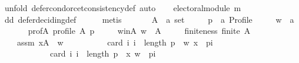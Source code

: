 \begin{isabellebody}
%
\isadelimproof
%
\endisadelimproof
%
\isatagproof
{}\isamarkupfalse%
\ {\isacharparenleft}{\kern0pt}unfold\ defer{\isacharunderscore}{\kern0pt}condorcet{\isacharunderscore}{\kern0pt}consistency{\isacharunderscore}{\kern0pt}def{\isacharcomma}{\kern0pt}\ auto{\isacharparenright}{\kern0pt}\isanewline
\ \ \isamarkupfalse%
\ {\isachardoublequoteopen}electoral{\isacharunderscore}{\kern0pt}module\ m{\isachardoublequoteclose}\isanewline
\ \ \ \ \isamarkupfalse%
\ dd\ defer{\isacharunderscore}{\kern0pt}deciding{\isacharunderscore}{\kern0pt}def\isanewline
\ \ \ \ \isamarkupfalse%
\ metis\isanewline
{}\isamarkupfalse%
\isanewline
\ \ \isamarkupfalse%
\isanewline
\ \ \ \ A\ {\isacharcolon}{\kern0pt}{\isacharcolon}{\kern0pt}\ {\isachardoublequoteopen}{\isacharprime}{\kern0pt}a\ set{\isachardoublequoteclose}\ \isanewline
\ \ \ \ p\ {\isacharcolon}{\kern0pt}{\isacharcolon}{\kern0pt}\ {\isachardoublequoteopen}{\isacharprime}{\kern0pt}a\ Profile{\isachardoublequoteclose}\ \isanewline
\ \ \ \ w\ {\isacharcolon}{\kern0pt}{\isacharcolon}{\kern0pt}\ {\isachardoublequoteopen}{\isacharprime}{\kern0pt}a{\isachardoublequoteclose}\isanewline
\ \ \isamarkupfalse%
\isanewline
\ \ \ \ prof{\isacharunderscore}{\kern0pt}A{\isacharcolon}{\kern0pt}\ {\isachardoublequoteopen}profile\ A\ p{\isachardoublequoteclose}\ \isanewline
\ \ \ \ w{\isacharunderscore}{\kern0pt}in{\isacharunderscore}{\kern0pt}A{\isacharcolon}{\kern0pt}\ {\isachardoublequoteopen}w\ {\isasymin}\ A{\isachardoublequoteclose}\ \isanewline
\ \ \ \ finiteness{\isacharcolon}{\kern0pt}\ {\isachardoublequoteopen}finite\ A{\isachardoublequoteclose}\ \isanewline
\ \ \ \ assm{\isacharcolon}{\kern0pt}\ {\isachardoublequoteopen}{\isasymforall}x{\isasymin}A\ {\isacharminus}{\kern0pt}\ {\isacharbraceleft}{\kern0pt}w{\isacharbraceright}{\kern0pt}{\isachardot}{\kern0pt}\isanewline
\ \ \ \ \ \ \ \ \ \ card\ {\isacharbraceleft}{\kern0pt}i{\isachardot}{\kern0pt}\ i\ {\isacharless}{\kern0pt}\ length\ p\ {\isasymand}\ {\isacharparenleft}{\kern0pt}w{\isacharcomma}{\kern0pt}\ x{\isacharparenright}{\kern0pt}\ {\isasymin}\ {\isacharparenleft}{\kern0pt}p{\isacharbang}{\kern0pt}i{\isacharparenright}{\kern0pt}{\isacharbraceright}{\kern0pt}\ {\isacharless}{\kern0pt}\isanewline
\ \ \ \ \ \ \ \ \ \ \ \ card\ {\isacharbraceleft}{\kern0pt}i{\isachardot}{\kern0pt}\ i\ {\isacharless}{\kern0pt}\ length\ p\ {\isasymand}\ {\isacharparenleft}{\kern0pt}x{\isacharcomma}{\kern0pt}\ w{\isacharparenright}{\kern0pt}\ {\isasymin}\ {\isacharparenleft}{\kern0pt}p{\isacharbang}{\kern0pt}i{\isacharparenright}{\kern0pt}{\isacharbraceright}{\kern0pt}{\isachardoublequoteclose}\isanewline

\end{isabellebody}
